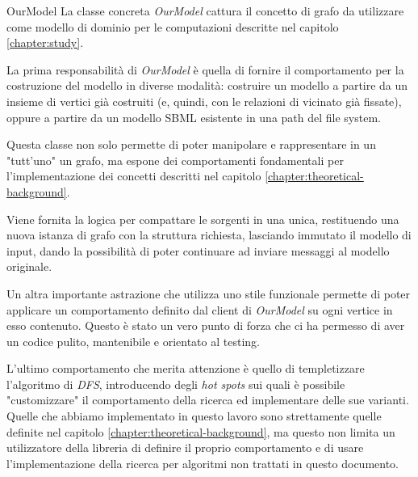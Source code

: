 \begin{paragraph}{OurModel}
  La classe concreta \emph{OurModel} cattura il concetto di grafo da
  utilizzare come modello di dominio per le computazioni descritte nel
  capitolo \ref{chapter:study}.

  La prima responsabilit\`a di \emph{OurModel} \`e quella di fornire
  il comportamento per la costruzione del modello in diverse
  modalit\`a: costruire un modello a partire da un insieme di vertici
  gi\`a costruiti (e, quindi, con le relazioni di vicinato gi\`a
  fissate), oppure a partire da un modello SBML esistente in una path
  del file system.

  Questa classe non solo permette di poter manipolare e rappresentare
  in un "tutt'uno" un grafo, ma espone dei comportamenti fondamentali
  per l'implementazione dei concetti descritti nel capitolo
  \ref{chapter:theoretical-background}.

  Viene fornita la logica per compattare le sorgenti in una unica,
  restituendo una nuova istanza di grafo con la struttura richiesta,
  lasciando immutato il modello di input, dando la possibilit\`a di
  poter continuare ad inviare messaggi al modello originale.

  Un altra importante astrazione che utilizza uno stile funzionale
  permette di poter applicare un comportamento definito dal client di
  \emph{OurModel} su ogni vertice in esso contenuto. Questo \`e stato
  un vero punto di forza che ci ha permesso di aver un codice pulito,
  mantenibile e orientato al testing.

  L'ultimo comportamento che merita attenzione \`e quello di
  templetizzare l'algoritmo di \emph{DFS}, introducendo degli
  \emph{hot spots} sui quali \`e possibile "customizzare" il
  comportamento della ricerca ed implementare delle sue
  varianti. Quelle che abbiamo implementato in questo lavoro sono
  strettamente quelle definite nel capitolo
  \ref{chapter:theoretical-background}, ma questo non limita un
  utilizzatore della libreria di definire il proprio comportamento e
  di usare l'implementazione della ricerca per algoritmi non trattati
  in questo documento.

\end{paragraph}

